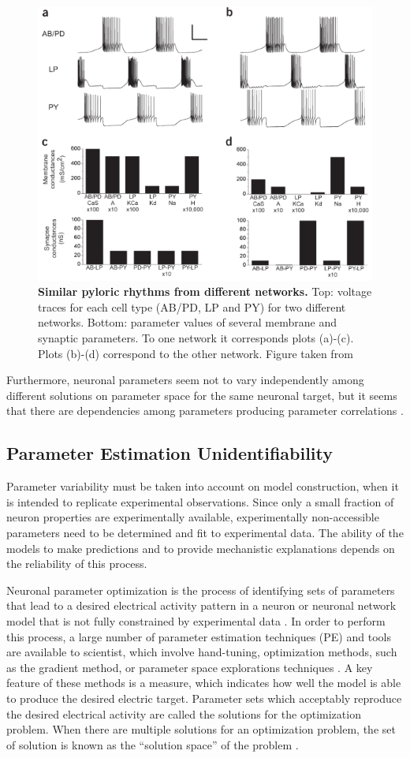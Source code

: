 \begin{figure}[htb]
\centering
    \includegraphics[width=0.8\linewidth]{Images/photonew3.png} 
  \caption{\textbf{Similar pyloric rhythms from different networks.} Top: voltage traces for each cell type (AB/PD, LP and PY) for two different networks. Bottom: parameter values of several membrane and synaptic parameters. To one network it corresponds plots (a)-(c). Plots (b)-(d) correspond to the other network. Figure taken from \cite{Prinz}}
  \label{photonew3}
\end{figure}

Furthermore, neuronal parameters seem not to vary independently among different solutions on parameter space for the same neuronal target, but it seems that there are dependencies among parameters producing parameter correlations \cite{Khorkova8709}.

\subsection{Parameter Estimation Unidentifiability}

Parameter variability must be taken into account on model construction, when it is intended to replicate experimental observations. Since only a small fraction of neuron properties are experimentally available, experimentally non-accessible parameters need to be determined and fit to experimental data. The ability of the models to make predictions and to provide mechanistic explanations depends on the reliability of this process.

Neuronal parameter optimization is the process of identifying sets of parameters that lead to a desired electrical activity pattern in a neuron or neuronal network model that is not fully constrained by experimental data \cite{sc}. In order to perform this process, a large number of parameter estimation techniques (PE) and tools are available to scientist, which involve hand-tuning, optimization methods, such as the gradient method, or parameter space explorations techniques \cite{sc1}. A key feature of these methods is a measure, which indicates how well the model is able to produce the desired electric target. Parameter sets which acceptably reproduce the desired electrical activity are called the solutions for the optimization problem. When there are  multiple solutions for an optimization problem, the set of solution is known as the “solution space” of the problem \cite{sc1}.

